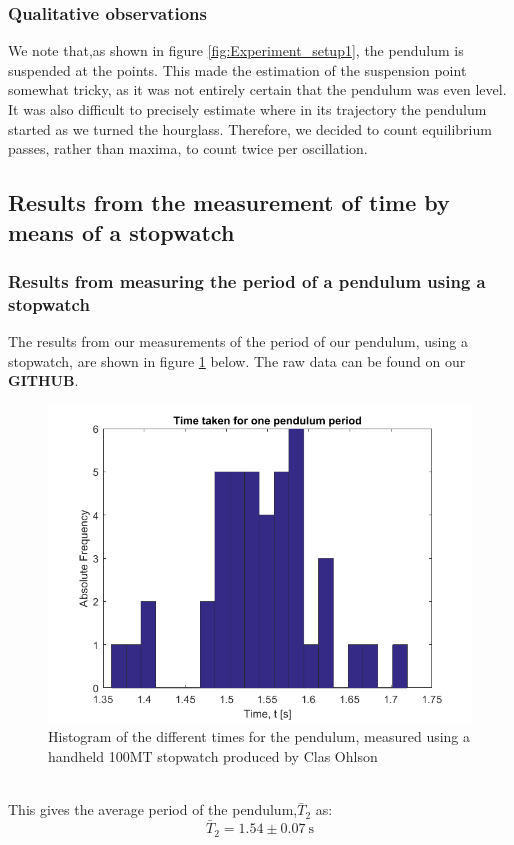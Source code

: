 \documentclass[a4paper, 10pt]{article}
\begin{document}
\subsubsection{Qualitative observations}
We note that,as shown in figure \ref{fig:Experiment_setup1}, the pendulum is suspended at the points. This made the estimation of the suspension point somewhat tricky, as it was not entirely certain that the pendulum was even level. It was also difficult to precisely estimate where in its trajectory the pendulum started as we turned the hourglass. Therefore, we decided to count equilibrium passes, rather than maxima, to count twice per oscillation. 
\subsection{Results from the measurement of time by means of a stopwatch}
\subsubsection{Results from measuring the period of a pendulum using a stopwatch}
The results from our measurements of the period of our pendulum, using a stopwatch, are shown in figure \ref{fig:Experiment_2} below. The raw data can be found on our \textbf{GITHUB}.
\begin{figure}[ht!]
\centering
\includegraphics[scale=0.7]{Experiment2.png}
\caption{Histogram of the different times for the pendulum, measured using a handheld 100MT stopwatch produced by Clas Ohlson}\label{fig:Experiment_2}
\end{figure}\\
This gives the average period of the pendulum,$\bar{T}_2$ as:
$$\bar{T}_2=1.54  \pm 0.07 \ \mathrm{s}$$
\newpage
\end{document}
